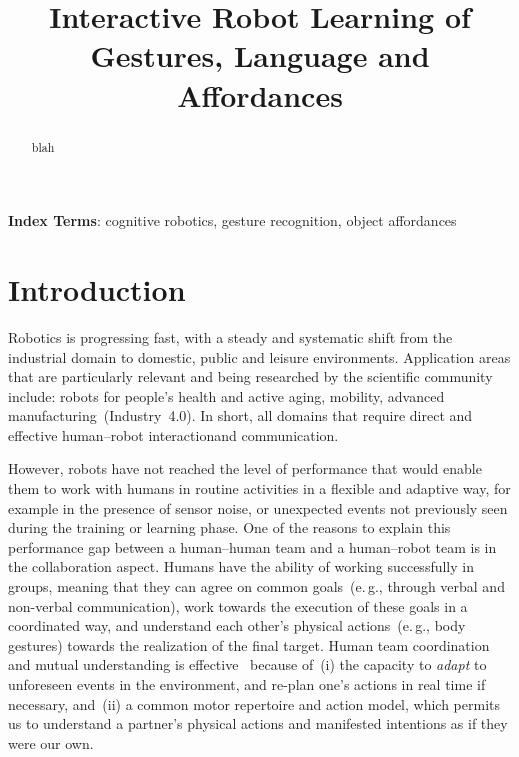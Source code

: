 \documentclass[a4paper]{article}
\title{Interactive Robot Learning of Gestures, Language and Affordances}
\newcommand{\eg}{e.\,g.}
\newcommand{\hh}{human--human}
\newcommand{\hr}{human--robot}
\newcommand{\hri}{\hr{} interaction}
\begin{document}
\maketitle
%
\begin{abstract} %
  blah
\end{abstract}
\noindent\textbf{Index Terms}: cognitive robotics, gesture recognition, object affordances

\section{Introduction}


Robotics is progressing fast, with a steady and systematic shift from the industrial domain to domestic, public and leisure environments. Application areas that are particularly relevant and being researched by the scientific community include: robots for people's health and active aging, mobility, advanced manufacturing~(Industry~4.0). In short, all domains that require direct and effective \hri and communication.

However, robots have not reached the level of performance that would enable them to work with humans in routine activities in a flexible and adaptive way, for example in the presence of sensor noise, or unexpected events not previously seen during the training or learning phase. One of the reasons to explain this performance gap between a \hh{} team and a \hr{} team is in the collaboration aspect. Humans have the ability of working successfully in groups, meaning that they can agree on common goals~(\eg, through verbal and non-verbal communication), work towards the execution of these goals in a coordinated way, and understand each other's physical actions~(\eg, body gestures) towards the realization of the final target. Human team coordination and mutual understanding is effective~\cite{ramnani:2004:natureneuro} because of~(i) the capacity to \emph{adapt} to unforeseen events in the environment, and re-plan one's actions in real time if necessary, and~(ii) a common motor repertoire and action model, which permits us to understand a partner's physical actions and manifested intentions as if they were our own.
\end{document}
